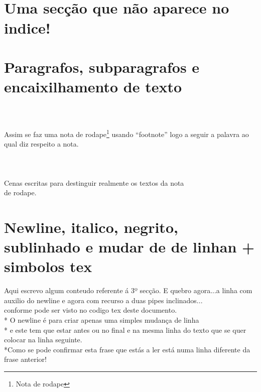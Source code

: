 \documentclass[a4paper,11pt]{article}%
\begin{document}
\paragraph{\ \ \ }%
\section*{Uma secção que não aparece no indice!}

\newpage
\section{Paragrafos, subparagrafos e encaixilhamento de texto}
\paragraph {}
\subparagraph{}
\paragraph{\ }

\newpage
Assim se faz uma nota de rodape\footnote {Nota de rodape} usando ``footnote'' logo a seguir a palavra ao qual diz respeito a nota.
\paragraph{\ }
Cenas escritas para destinguir realmente os textos da nota \\ de rodape.


\newpage

\section{Newline, italico, negrito, sublinhado e mudar de de linhan + simbolos tex}
Aqui escrevo algum conteudo referente á 3º secção. E quebro agora...\newline a linha com auxilio do newline e agora com recurso a duas pipes inclinados... \\conforme pode ser visto no codigo tex deste documento. \\*
O newline é para criar apenas uma simples mudança de linha \\* e este tem que estar antes ou no final e na mesma linha do texto que se quer colocar na linha seguinte. \\*Como se pode confirmar esta frase que estás a ler está numa linha diferente da frase anterior!
\end{document}
